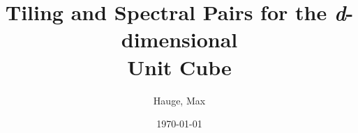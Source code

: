 
\author{Hauge, Max}


\newif\ifSINGLESUPERVISOR
\SINGLESUPERVISORfalse  %

\ifSINGLESUPERVISOR
    \newcommand{\supervisorGrammar}{Supervisor}
    \newcommand{\supervisor_A}{Grepstad, Sigrid}
\else
    \newcommand{\supervisorGrammar}{Supervisors}
    \newcommand{\supervisorA}{Grepstad, Sigrid}
    \newcommand{\supervisorB}{Heap, Winston}  %
\fi


\title{Tiling and Spectral Pairs for the \emph{d}-dimensional\\ Unit Cube}  %


\newcommand{\emnekode}{MA3911 — masteroppgave i matematiske fag}


\renewcommand{\NTNUinstitutt}{Institute of Mathematical Sciences}
\renewcommand{\NTNUinstituttLowerC}{institute of mathematical sciences}


\date{\today}
